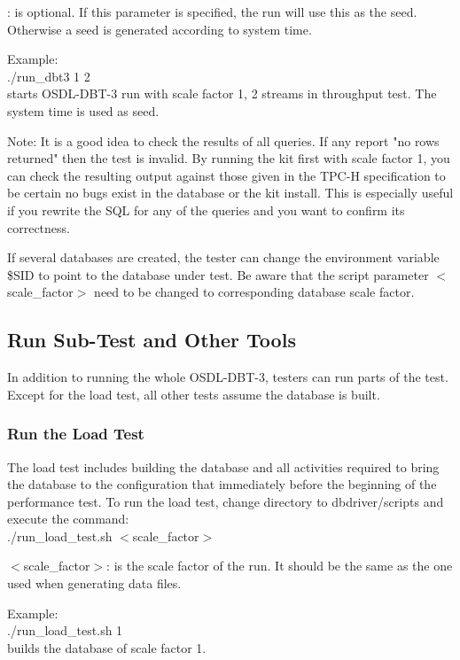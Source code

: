 \documentclass{article}
\begin{document}
\noindent
[seed]: is optional.  If this parameter is specified, the run will
use this as the seed.  Otherwise a seed is generated according to
system time.

\noindent
Example: \\
\indent ./run\_dbt3 1 2 \\
\indent starts OSDL-DBT-3 run with scale factor 1, 2 streams in throughput test.  The system time is used as seed.

\noindent
Note:  It is a good idea to check the results of all queries.  If any
report "no rows returned" then the test is invalid.  By running the
kit first with scale factor 1, you can check the resulting output
against those given in the TPC-H specification to be certain no bugs
exist in the database or the kit install.  This is especially useful
if you rewrite the SQL for any of the queries and you want to confirm
its correctness.

\noindent
If several databases are created, the tester can change the
environment variable \$SID to point to the database under test.  Be
aware that the script parameter $<$scale\_factor$>$ need to be changed to
corresponding database scale factor.

\subsection{Run Sub-Test and Other Tools}

\noindent
In addition to running the whole OSDL-DBT-3, testers can run parts of
the test.  Except for the load test, all other tests assume the
database is built.

\subsubsection{Run the Load Test}

\noindent
The load test includes building the database and all activities
required to bring the database to the configuration that immediately
before the beginning of the performance test.  To run the load test,
change directory to dbdriver/scripts and execute the command: \\
\indent ./run\_load\_test.sh  $<$scale\_factor$>$ 

\noindent
$<$scale\_factor$>$: is the scale factor of the run.  It should be the same
as the one used when generating data files.

\noindent
Example: \\
\indent ./run\_load\_test.sh 1 \\
\indent builds the database of scale factor 1.
\end{document}
